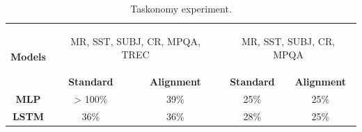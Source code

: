 \begin{table}
	\begin{center}
		\begin{tabular}{c c c c c}
		\toprule
		\multirow{2}{*}{{\bf Models}} & \multicolumn{2}{c}{\begin{minipage}{1.1in}\begin{center}
		MR, SST, SUBJ, CR, MPQA, TREC\end{center}\end{minipage}} & \multicolumn{2}{c}{\begin{minipage}{1.1in}\begin{center}MR, SST, SUBJ, CR, MPQA\end{center}\end{minipage}} \\
		\cmidrule(lr){2-3} \cmidrule(lr){4-5}
		& {\bf Standard} & {\bf Alignment} & {\bf Standard} & {\bf Alignment} \\
		\midrule
		{\bf MLP}  & > 100\% & 39\% & 25\% & 25\% \\
		{\bf LSTM} & 36\% & 36\% & 28\% & 25\% \\
		\bottomrule
		\end{tabular}
	\end{center}
	\caption{Taskonomy experiment.}
	\label{tab:taskonomy}
	\end{table}


